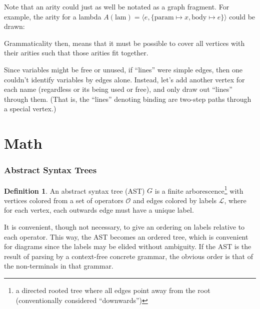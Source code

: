 \documentclass[11pt]{article} %
\theoremstyle{definition}
\newtheorem{dfn}{Definition}
\begin{document}
Note that an arity could just as well be notated as a graph fragment. For example, the arity for a lambda $A(\mathrm{lam}) = \langle e, \{\mathrm{param} \mapsto x, \mathrm{body} \mapsto e\} \rangle$ could be drawn:
\begin{center}
\end{center}
Grammaticality then, means that it must be possible to cover all vertices with their arities such that those arities fit together.

Since variables might be free or unused, if ``lines'' were simple edges, then one couldn't identify variables by edges alone.
Instead, let's add another vertex for each name (regardless or its being used or free), and only draw out ``lines'' through them.
(That is, the ``lines'' denoting binding are two-step paths through a special vertex.)

\part{Math}

\section{Abstract Syntax Trees}

\begin{dfn}
An abstract syntax tree (AST) $G$ is a finite arborescence\footnote{a directed rooted tree where all edges point away from the root (conventionally considered ``downwards'')} with vertices colored from a set of operators $\mathcal{O}$ and edges colored by labels $\mathcal{L}$, where for each vertex, each outwards edge must have a unique label.
\end{dfn}

It is convenient, though not necessary, to give an ordering on labels relative to each operator.
This way, the AST becomes an ordered tree, which is convenient for diagrams since the labels may be elided without ambiguity.
If the AST is the result of parsing by a context-free concrete grammar, the obvious order is that of the non-terminals in that grammar.
\end{document}
